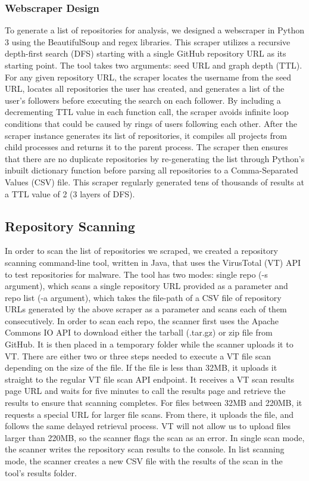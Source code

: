 \documentclass[]{acmart}
\begin{document}
\subsubsection{Webscraper Design}
To generate a list of repositories for analysis, we designed a webscraper in Python 3 using the BeautifulSoup and regex libraries. This scraper utilizes a recursive depth-first search (DFS) starting with a single GitHub repository URL as its starting point. The tool takes two arguments: seed URL and graph depth (TTL). For any given repository URL, the scraper locates the username from the seed URL, locates all repositories the user has created, and generates a list of the user's followers before executing the search on each follower. By including a decrementing TTL value in each function call, the scraper avoids infinite loop conditions that could be caused by rings of users following each other. After the scraper instance generates its list of repositories, it compiles all projects from child processes and returns it to the parent process. The scraper then ensures that there are no duplicate repositories by re-generating the list through Python's inbuilt dictionary function before parsing all repositories to a Comma-Separated Values (CSV) file. This scraper regularly generated tens of thousands of results at a TTL value of 2 (3 layers of DFS).
\subsection{Repository Scanning}
In order to scan the list of repositories we scraped, we created a repository scanning command-line tool, written in Java, that uses the VirusTotal (VT) API to test repositories for malware. The tool has two modes: single repo (-s argument), which scans a single repository URL provided as a parameter and repo list (-a argument), which takes the file-path of a CSV file of repository URLs generated by the above scraper as a parameter and scans each of them consecutively. In order to scan each repo, the scanner first uses the Apache Commons IO API to download either the tarball (.tar.gz) or zip file from GitHub. It is then placed in a temporary folder while the scanner uploads it to VT. There are either two or three steps needed to execute a VT file scan depending on the size of the file. If the file is less than 32MB, it uploads it straight to the regular VT file scan API endpoint. It receives a VT scan results page URL and waits for five minutes to call the results page and retrieve the results to ensure that scanning completes. For files between 32MB and 220MB, it requests a special URL for larger file scans. From there, it uploads the file, and follows the same delayed retrieval process. VT will not allow us to upload files larger than 220MB, so the scanner flags the scan as an error. In single scan mode, the scanner writes the repository scan results to the console. In list scanning mode, the scanner creates a new CSV file with the results of the scan in the tool's results folder.
\end{document}
